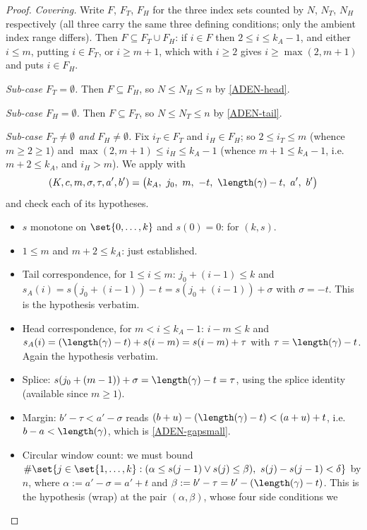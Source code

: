 \begin{proof}
  \emph{Covering.} Write $F$, $F_T$, $F_H$ for the three index sets counted by $N$, $N_T$, $N_H$
  respectively (all three carry the same three defining conditions; only the ambient index range
  differs). Then $F\subseteq F_T\cup F_H$: if $i\in F$ then $2\le i\le k_A-1$, and either $i\le m$,
  putting $i\in F_T$, or $i\ge m+1$, which with $i\ge2$ gives $i\ge\max(2,m+1)$ and puts
  $i\in F_H$.

  \emph{Sub-case $F_T=\emptyset$.} Then $F\subseteq F_H$, so $N\le N_H\le n$ by \eqref{ADEN-head}.

  \emph{Sub-case $F_H=\emptyset$.} Then $F\subseteq F_T$, so $N\le N_T\le n$ by \eqref{ADEN-tail}.

  \emph{Sub-case $F_T\ne\emptyset$ and $F_H\ne\emptyset$.} Fix $i_T\in F_T$ and $i_H\in F_H$; so
  $2\le i_T\le m$ (whence $m\ge2\ge1$) and $\max(2,m+1)\le i_H\le k_A-1$ (whence $m+1\le k_A-1$,
  i.e.\ $m+2\le k_A$, and $i_H>m$). We apply  with
  \[
    (K,c,m,\sigma,\tau,a',b') = \bigl(k_A,\ j_0,\ m,\ -t,\ \length(\gamma)-t,\ a',\ b'\bigr)
  \]
  and check each of its hypotheses.
  \begin{itemize}
    \item $s$ monotone on $\set{0,\dots,k}$ and $s(0)=0$:  for
      $(k,s)$.
    \item $1\le m$ and $m+2\le k_A$: just established.
    \item Tail correspondence, for $1\le i\le m$: $j_0+(i-1)\le k$ and
      $s_A(i)=s(j_0+(i-1))-t=s(j_0+(i-1))+\sigma$ with $\sigma=-t$. This is the hypothesis
      verbatim.
    \item Head correspondence, for $m<i\le k_A-1$: $i-m\le k$ and
      $s_A(i)=(\length(\gamma)-t)+s(i-m)=s(i-m)+\tau$ with $\tau=\length(\gamma)-t$. Again the
      hypothesis verbatim.
    \item Splice: $s(j_0+(m-1))+\sigma = \length(\gamma)-t = \tau$, using the splice identity
      (available since $m\ge1$).
    \item Margin: $b'-\tau < a'-\sigma$ reads $(b+u)-(\length(\gamma)-t) < (a+u)+t$, i.e.\
      $b-a<\length(\gamma)$, which is \eqref{ADEN-gapsmall}.
    \item Circular window count: we must bound
      $\#\set{j\in\set{1,\dots,k} : (\alpha\le s(j-1)\vee s(j)\le\beta),\ s(j)-s(j-1)<\delta}$
      by $n$, where $\alpha := a'-\sigma = a'+t$ and $\beta := b'-\tau = b'-(\length(\gamma)-t)$.
      This is the hypothesis (wrap) at the pair $(\alpha,\beta)$, whose four side conditions we

\end{itemize}
\end{proof}

